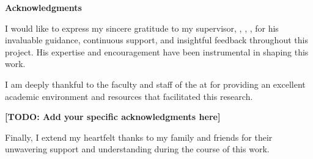 \begin{flushright}
  \huge{\textbf{Acknowledgments}}
\end{flushright}

\vspace{0.5cm}

I would like to express my sincere gratitude to my supervisor, \supname{}, \suppost{}, \supdeptname{}, for his invaluable guidance, continuous support, and insightful feedback throughout this project. His expertise and encouragement have been instrumental in shaping this work.

I am deeply thankful to the faculty and staff of the \deptname{} at \univname{} for providing an excellent academic environment and resources that facilitated this research.

\textbf{[TODO: Add your specific acknowledgments here]}

Finally, I extend my heartfelt thanks to my family and friends for their unwavering support and understanding during the course of this work.

\vspace{2cm}

\begin{flushright}
  \textbf{\authorname}\\
  \rn
\end{flushright}